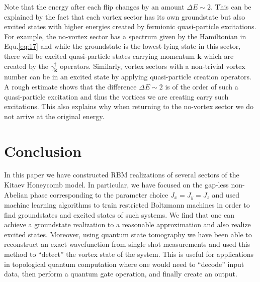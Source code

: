 \documentclass{article}
\begin{document}
Note that the energy after each flip changes by an amount $\Delta E \sim 2$. This can be explained by the fact that each vortex sector has its own groundstate but also excited states with higher energies created by fermionic quasi-particle excitations. For example, the no-vortex sector has a spectrum given by the Hamiltonian in Equ.\hspace{0.2mm}\ref{eq:17} and while the groundstate is the lowest lying state in this sector, there will be excited quasi-particle states carrying momentum $\mathbf{k}$ which are created by the $\gamma^{\dagger}_{\mathbf{k}}$ operators. Similarly, vortex sectors with a non-trivial vortex number can be in an excited state by applying quasi-particle creation operators. A rough estimate shows that the difference $\Delta E \sim 2$ is of the order of such a quasi-particle excitation and thus the vortices we are creating carry such excitations. This also explains why when returning to the no-vortex sector we do not arrive at the original energy.





\section{Conclusion}\label{sec6}
\label{sec:conclusion}

In this paper we have constructed RBM realizations of several sectors of the Kitaev Honeycomb model. In particular, we have focused on the gap-less non-Abelian phase corresponding to the parameter choice $J_x = J_y = J_z$ and used machine learning algorithms to train restricted Boltzmann machines in order to find groundstates and excited states of such systems. We find that one can achieve a groundstate realization to a reasonable approximation and also realize excited states. Moreover, using quantum state tomography we have been able to reconstruct an exact wavefunction from single shot measurements and used this method to ``detect'' the vortex state of the system. This is useful for applications in topological quantum computation where one would need to  ``decode'' input data, then perform a quantum gate operation, and finally create an output. 
\end{document}
